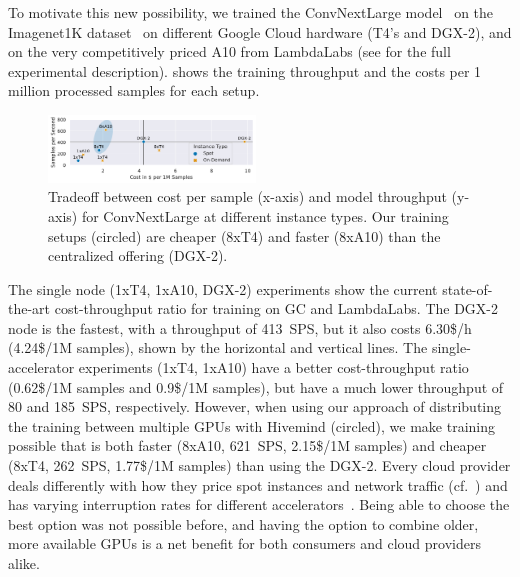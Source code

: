 To motivate this new possibility, we trained the ConvNextLarge model~\cite{liu2022convnet} on the Imagenet1K dataset~\cite{deng2009imagenet} on different Google Cloud hardware (T4's and DGX-2), and on the very competitively priced A10 from LambdaLabs (see  for the full experimental description).
 shows the training throughput and the costs per 1 million processed samples for each setup.
\begin{figure} 
    \includegraphics[width=0.49\textwidth]{figures/misc/cv_cost_per_sps_comparison}
    \vspace{-20pt} 
    \caption{Tradeoff between cost per sample (x-axis) and model throughput (y-axis) for ConvNextLarge at different instance types. Our training setups (circled) are cheaper (8xT4) and faster (8xA10) than the centralized offering (DGX-2).} 
    \label{fig:cv-sps-trade-off}
    \vspace*{-5mm} 
\end{figure} 
The single node (1xT4, 1xA10, DGX-2) experiments show the current state-of-the-art cost-throughput ratio for training on GC and LambdaLabs.
The DGX-2 node is the fastest, with a throughput of 413~SPS, but it also costs 6.30\$/h (4.24\$/1M samples), shown by the horizontal and vertical lines.
The single-accelerator experiments (1xT4, 1xA10) have a better cost-throughput ratio (0.62\$/1M samples and 0.9\$/1M samples), but have a much lower throughput of 80 and 185~SPS, respectively.
However, when using our approach of distributing the training between multiple GPUs with Hivemind (circled), we make training possible that is both faster (8xA10, 621~SPS, 2.15\$/1M samples) and cheaper (8xT4, 262~SPS, 1.77\$/1M samples) than using the DGX-2.
Every cloud provider deals differently with how they price spot instances and network traffic (cf.~) and has varying interruption rates for different accelerators~\cite{lee2017deepspotcloud}.
Being able to choose the best option was not possible before, and having the option to combine older, more available GPUs is a net benefit for both consumers and cloud providers alike.
 
